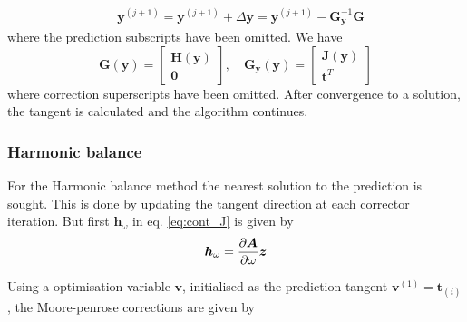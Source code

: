 \begin{equation}
  \label{eq:nnm_cont_corr}
  \begin{aligned}
    &\bm y^{(j+1)} = \bm y^{(j+1)} + \Delta \bm y =
    \bm y^{(j+1)} -\bm G^{-1}_{\bm y} \bm G
  \end{aligned}
\end{equation}
where the prediction subscripts have been omitted. We have
\begin{equation}
  \label{eq:nnm_cont_mat}
  \bm G(\bm y) =
      \begin{bmatrix}
      \bm H(\bm y) \\ \bm 0
    \end{bmatrix}, \quad
    \bm G_{\bm y}(\bm y) =
    \begin{bmatrix}
      \bm J(\bm y) \\ \bm t^T
    \end{bmatrix}
  \end{equation}
where correction superscripts have been omitted. After convergence to a
solution, the tangent is calculated and the algorithm continues.

\subsubsection{Harmonic balance}
\label{sec:hb_cont}


For the Harmonic balance method the nearest solution to the prediction is
sought. This is done by updating the tangent direction at each corrector
iteration. But first $\bm h_\omega$ in eq. \eqref{eq:cont_J} is given by
\begin{equation}
  \label{eq:hb_cont_Hw}
  \bm h_\omega = \frac{\partial \bm A}{\partial \omega} \bm z
\end{equation}

Using a optimisation variable $\bm v$, initialised as the prediction tangent
$\bm v^{(1)} = \bm t_{(i)}$, the Moore-penrose corrections are given by

